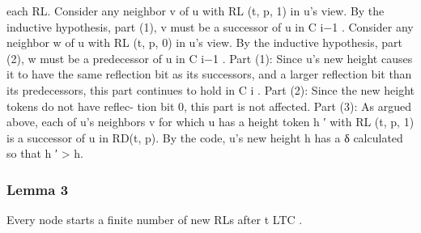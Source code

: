 \documentclass{article}
\begin{document}
each RL.
Consider any neighbor v of u with RL (t, p, 1) in u’s
view. By the inductive hypothesis, part (1), v must be a
successor of u in C i−1 . Consider any neighbor w of u with
RL (t, p, 0) in u’s view. By the inductive hypothesis, part
(2), w must be a predecessor of u in C i−1 .
Part (1): Since u’s new height causes it to have the same
reflection bit as its successors, and a larger reflection bit
than its predecessors, this part continues to hold in C i .
Part (2): Since the new height tokens do not have reflec-
tion bit 0, this part is not affected.
Part (3): As argued above, each of u’s neighbors v for
which u has a height token h ′ with RL (t, p, 1) is a successor
of u in RD(t, p). By the code, u’s new height h has a δ
calculated so that h ′ > h.


\subsubsection{Lemma 3}
Every node starts a finite number of new RLs
after t LTC .
\end{document}
